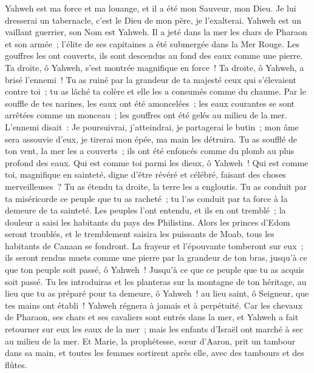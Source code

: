 \begin{multicols}{2}
Yahweh est ma force et ma louange, et il a été mon Sauveur, mon Dieu. Je lui dresserai un tabernacle, c'est le Dieu de mon père, je l'exalterai.
Yahweh est un vaillant guerrier, son Nom est Yahweh.
Il a jeté dans la mer les chars de Pharaon et son armée~; l'élite de ses capitaines a été submergée dans la Mer Rouge.
Les gouffres les ont couverts, ils sont descendus au fond des eaux comme une pierre.
Ta droite, ô Yahweh, s'est montrée magnifique en force~! Ta droite, ô Yahweh, a brisé l'ennemi~!
Tu as ruiné par la grandeur de ta majesté ceux qui s'élevaient contre toi~; tu as lâché ta colère et elle les a consumés comme du chaume.
Par le souffle de tes narines, les eaux ont été amoncelées~; les eaux courantes se sont arrêtées comme un monceau~; les gouffres ont été gelés au milieu de la mer.
L'ennemi disait~: Je poursuivrai, j'atteindrai, je partagerai le butin~; mon âme sera assouvie d'eux, je tirerai mon épée, ma main les détruira.
Tu as soufflé de ton vent, la mer les a couverts~; ils ont été enfoncés comme du plomb au plus profond des eaux.
Qui est comme toi parmi les dieux, ô Yahweh~! Qui est comme toi, magnifique en sainteté, digne d'être révéré et célébré, faisant des choses merveilleuses~?
Tu as étendu ta droite, la terre les a engloutis.
Tu as conduit par ta miséricorde ce peuple que tu as racheté~; tu l'as conduit par ta force à la demeure de ta sainteté.
Les peuples l'ont entendu, et ils en ont tremblé~; la douleur a saisi les habitants du pays des Philistins.
Alors les princes d'Edom seront troublés, et le tremblement saisira les puissants de Moab, tous les habitants de Canaan se fondront.
La frayeur et l'épouvante tomberont sur eux~; ils seront rendus muets comme une pierre par la grandeur de ton bras, jusqu'à ce que ton peuple soit passé, ô Yahweh~! Jusqu'à ce que ce peuple que tu as acquis soit passé.
Tu les introduiras et les planteras sur la montagne de ton héritage, au lieu que tu as préparé pour ta demeure, ô Yahweh~! au lieu saint, ô Seigneur, que tes mains ont établi~!
Yahweh régnera à jamais et à perpétuité.
Car les chevaux de Pharaon, ses chars et ses cavaliers sont entrés dans la mer, et Yahweh a fait retourner sur eux les eaux de la mer~; mais les enfants d'Israël ont marché à sec au milieu de la mer.
Et Marie, la prophétesse, sœur d'Aaron, prit un tambour dans sa main, et toutes les femmes sortirent après elle, avec des tambours et des flûtes.

\end{multicols}
